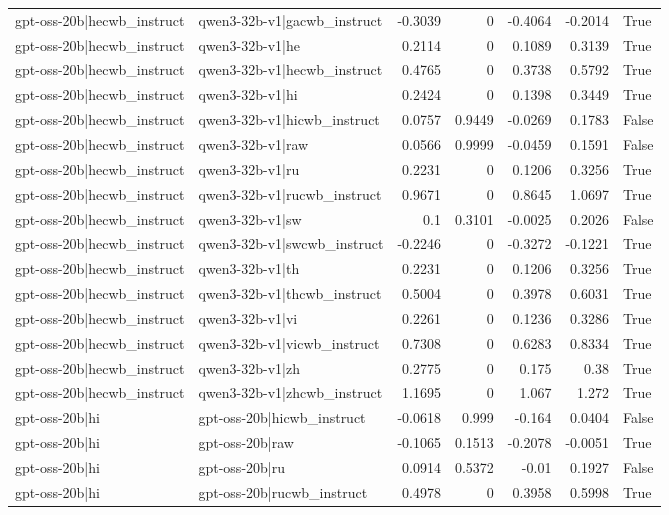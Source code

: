\begin{table}
\begin{tabular}{l l r r r r l}
gpt-oss-20b|hecwb_instruct & qwen3-32b-v1|gacwb_instruct & -0.3039 & 0 & -0.4064 & -0.2014 & True \\
gpt-oss-20b|hecwb_instruct & qwen3-32b-v1|he & 0.2114 & 0 & 0.1089 & 0.3139 & True \\
gpt-oss-20b|hecwb_instruct & qwen3-32b-v1|hecwb_instruct & 0.4765 & 0 & 0.3738 & 0.5792 & True \\
gpt-oss-20b|hecwb_instruct & qwen3-32b-v1|hi & 0.2424 & 0 & 0.1398 & 0.3449 & True \\
gpt-oss-20b|hecwb_instruct & qwen3-32b-v1|hicwb_instruct & 0.0757 & 0.9449 & -0.0269 & 0.1783 & False \\
gpt-oss-20b|hecwb_instruct & qwen3-32b-v1|raw & 0.0566 & 0.9999 & -0.0459 & 0.1591 & False \\
gpt-oss-20b|hecwb_instruct & qwen3-32b-v1|ru & 0.2231 & 0 & 0.1206 & 0.3256 & True \\
gpt-oss-20b|hecwb_instruct & qwen3-32b-v1|rucwb_instruct & 0.9671 & 0 & 0.8645 & 1.0697 & True \\
gpt-oss-20b|hecwb_instruct & qwen3-32b-v1|sw & 0.1 & 0.3101 & -0.0025 & 0.2026 & False \\
gpt-oss-20b|hecwb_instruct & qwen3-32b-v1|swcwb_instruct & -0.2246 & 0 & -0.3272 & -0.1221 & True \\
gpt-oss-20b|hecwb_instruct & qwen3-32b-v1|th & 0.2231 & 0 & 0.1206 & 0.3256 & True \\
gpt-oss-20b|hecwb_instruct & qwen3-32b-v1|thcwb_instruct & 0.5004 & 0 & 0.3978 & 0.6031 & True \\
gpt-oss-20b|hecwb_instruct & qwen3-32b-v1|vi & 0.2261 & 0 & 0.1236 & 0.3286 & True \\
gpt-oss-20b|hecwb_instruct & qwen3-32b-v1|vicwb_instruct & 0.7308 & 0 & 0.6283 & 0.8334 & True \\
gpt-oss-20b|hecwb_instruct & qwen3-32b-v1|zh & 0.2775 & 0 & 0.175 & 0.38 & True \\
gpt-oss-20b|hecwb_instruct & qwen3-32b-v1|zhcwb_instruct & 1.1695 & 0 & 1.067 & 1.272 & True \\
gpt-oss-20b|hi & gpt-oss-20b|hicwb_instruct & -0.0618 & 0.999 & -0.164 & 0.0404 & False \\
gpt-oss-20b|hi & gpt-oss-20b|raw & -0.1065 & 0.1513 & -0.2078 & -0.0051 & True \\
gpt-oss-20b|hi & gpt-oss-20b|ru & 0.0914 & 0.5372 & -0.01 & 0.1927 & False \\
gpt-oss-20b|hi & gpt-oss-20b|rucwb_instruct & 0.4978 & 0 & 0.3958 & 0.5998 & True \\

\end{tabular}
\end{table}
